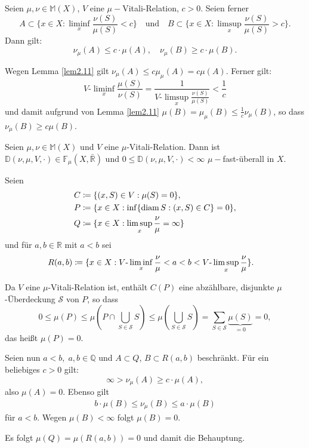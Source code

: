 \documentclass[a4paper,twoside,DIV15,BCOR12mm]{scrbook}
\DeclareMathOperator{\diam}{diam}
\begin{document}
\begin{korollar}
\label{kor:2.12}
Seien \(\mu,\nu \in \mathbb{M}(X)\), \(V\) eine \(\mu-\)Vitali-Relation, \(c>0\). Seien ferner
\[
A\subset \{x\in X:\liminf_x\frac{\nu(S)}{\mu(S)}<c\}
\quad\text{und}\quad
B\subset\{x\in X:\limsup_x\frac{\nu(S)}{\mu(S)}>c\}.
\]
Dann gilt:
\[
\nu_\mu(A) \leq c\cdot\mu(A), \quad \nu_\mu(B) \geq c\cdot\mu(B).
\]
\end{korollar}
\begin{beweis}
Wegen Lemma \ref{lem2.11} gilt \(\nu_\mu(A) \leq c\mu_\mu(A) = c\mu(A)\). Ferner gilt:
\[
V\text{-}\liminf_x\frac{\mu(S)}{\nu(S)} = \frac1{V\text{-}\limsup_x\frac{\nu(S)}{\mu(S)}} < \frac1c
\]
und damit aufgrund von Lemma \ref{lem2.11} 
$\mu(B) = \mu_\mu(B) \leq \frac1c \nu_\mu(B)$, so dass $\nu_\mu(B) \geq c\mu(B)$.
\end{beweis}

\begin{lemma}
\label{lem2.13}
Seien \(\mu,\nu \in \mathbb{M}(X)\) und \(V\) eine \(\mu\)-Vitali-Relation. Dann ist \(\mathbb{D}(\nu,\mu,V,\cdot) \in \mathbb{F}_\mu(X,\bar{\mathbb{R}})\) und \(0 \leq \mathbb{D}(\nu,\mu,V,\cdot) < \infty\) \(\mu-\)fast-überall in \(X\).
\end{lemma}
\begin{beweis}
Seien
\begin{align*}
C & \da \{ (x,S) \in V : \mu(S) = 0 \}, \\
P & \da \{ x \in X : \inf\{\diam S : (x,S) \in C\} = 0 \}, \\
Q & \da \{ x \in X : \limsup_x\frac\nu\mu = \infty \}
\end{align*}
und für \(a,b \in \mathbb{R}\) mit \(a < b\) sei
\begin{align*} 
R(a,b) & \da \{ x \in X : V\text{-}\liminf_x\frac\nu\mu<a<b<V\text{-}\limsup_x\frac\nu\mu \}.
\end{align*}

Da \(V\) eine \(\mu\)-Vitali-Relation ist, enthält \(C(P)\) eine abzählbare, disjunkte \(\mu\)-Überdeckung \(\mathcal{S}\) von \(P\), so dass
\[
0 \leq \mu(P) \leq \mu(P\cap\bigcup_{S\in\mathcal{S}}S) \leq \mu(\bigcup_{S\in\mathcal{S}}S) = \sum_{S\in\mathcal{S}}\underbrace{\mu(S)}_{=0} = 0 ,
\]
das heißt \(\mu(P) = 0\).

Seien nun \(a<b,\; a,b\in\mathbb{Q}\) und \(A \subset Q\), \(B \subset R(a,b)\) beschränkt. 
Für ein beliebiges \(c > 0\) gilt:
\[
\infty > \nu_\mu(A) \geq c\cdot\mu(A),
\]
also $\mu(A) = 0$. 
Ebenso gilt
\begin{align*}
b\cdot\mu(B) \leq \nu_\mu(B) \leq a\cdot\mu(B)
\end{align*}
für $a < b$. Wegen $\mu(B)<\infty$ folgt \(\mu(B)=0\).

Es folgt \(\mu(Q) = \mu(R(a,b)) = 0\) und damit die Behauptung.
\end{beweis}
\end{document}

